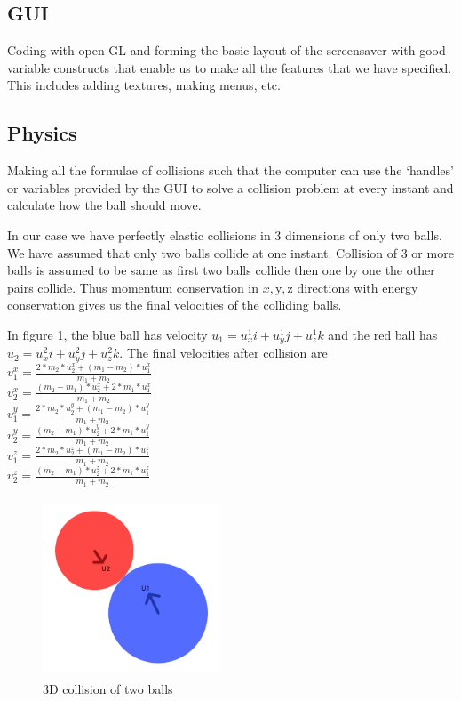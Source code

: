\documentclass{article}
\begin{document}
	\subsection{GUI}
	Coding with open GL and forming the basic layout of the screensaver with good variable constructs that enable us to make all the features that we have specified. This includes adding textures, making menus, etc.
	\subsection{Physics}
	Making all the formulae of collisions such that the computer can use the `handles' or variables provided by the GUI to solve a collision problem at every instant and calculate how the ball should move.
	
	In our case we have perfectly elastic collisions in 3 dimensions of only two balls. We have assumed that only two balls collide at one instant. Collision of 3 or more balls is assumed to be same as first two balls collide then one by one the other pairs collide. Thus momentum conservation in $x, $y$, $z directions with energy conservation gives us the final velocities of the colliding balls.
	
	In figure 1, the blue ball has velocity $u_1 = u_x^1i+u_y^1j+u_z^1k$ and the red ball has $u_2 = u_x^2i+u_y^2j+u_z^2k$.
	The final velocities after collision are \\[8pt]
	
	$v_1^x=\frac{2*m_2*u_2^x+(m_1-m_2)*u_1^x}{m_1+m_2}$\\[8pt]
	
	
    $v_2^x=\frac{(m_2-m_1)*u_2^x+2*m_1*u_1^x}{m_1+m_2}$\\[8pt]
    
    
    $v_1^y=\frac{2*m_2*u_2^y+(m_1-m_2)*u_1^y}{m_1+m_2}$\\[8pt]
    
    
    $v_2^y=\frac{(m_2-m_1)*u_2^y+2*m_1*u_1^y}{m_1+m_2}$\\[8pt]
    
    
   $v_1^z=\frac{2*m_2*u_2^z+(m_1-m_2)*u_1^z}{m_1+m_2}$\\[8pt]
    
    
    $v_2^z=\frac{(m_2-m_1)*u_2^z+2*m_1*u_1^z}{m_1+m_2}$
    
	\begin{figure}
  	\centering
 	 \includegraphics[width=150pt,height=150pt]{diagram.jpg}
	  \caption{3D collision of two balls}
	  \label{fig1}
  	\end{figure}
	
\end{document}
